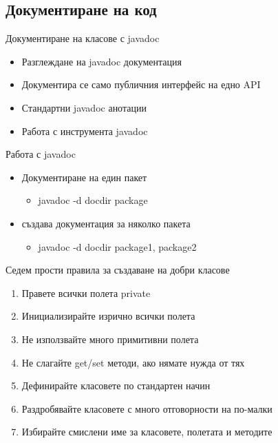 \documentclass{beamer}
\begin{document}
\subsection{Документиране на код}
\begin{frame}{Документиране на класове с javadoc}
  \transdissolve
  \begin{itemize}
  \item Разглеждане на javadoc документация
  \item Документира се само публичния интерфейс на едно API
  \item Стандартни javadoc анотации
  \item Работа с инструмента javadoc
  \end{itemize}
\end{frame}

\begin{frame}{Работа с javadoc}
  \transdissolve
  \begin{itemize}
  \item Документиране на един пакет
    \begin{itemize}
    \item javadoc -d docdir package
    \end{itemize}
  \item създава документация за няколко пакета
    \begin{itemize}
    \item javadoc -d docdir package1, package2
    \end{itemize}
  \end{itemize}
\end{frame}

\begin{frame}{Седем прости правила за създаване на добри класове}
  \transdissolve
  \begin{enumerate}
  \item Правете всички полета private \pause
  \item Инициализирайте изрично всички полета \pause
  \item Не използвайте много примитивни полета \pause
  \item Не слагайте get/set методи, ако нямате нужда от тях \pause
  \item Дефинирайте класовете по стандартен начин \pause
  \item Раздробявайте класовете с много отговорности на по-малки \pause
  \item Избирайте смислени име за класовете, полетата и методите
  \end{enumerate}
\end{frame}
\end{document}
